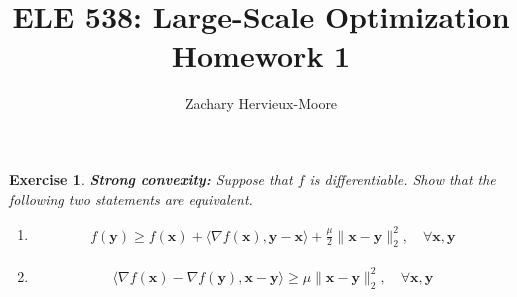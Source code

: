 \documentclass[12pt]{article}
\title{ELE 538: Large-Scale Optimization \\ Homework 1}
\author{Zachary Hervieux-Moore}
\date{\displaydate{date}}
\theoremstyle{colon}
\newtheorem{exercise}{Exercise}
\begin{document}
\maketitle

\clearpage

\begin{exercise}
  \textbf{Strong convexity:} Suppose that $f$ is differentiable. Show that the following two statements are equivalent.

  \begin{enumerate}[label=\roman*)]
    \item
      \begin{gather*}
        f(\bm{y}) \geq f(\bm{x}) + \langle \nabla f(\bm{x}), \bm{y} - \bm{x} \rangle + \frac{\mu}{2} \lVert \bm{x} - \bm{y} \rVert_2^2, \quad \forall \bm{x}, \bm{y}
      \end{gather*}

    \item
      \begin{gather*}
        \langle \nabla f(\bm{x}) - \nabla f(\bm{y}), \bm{x} - \bm{y} \rangle \geq \mu \lVert \bm{x} - \bm{y} \rVert_2^2, \quad \forall \bm{x}, \bm{y}
      \end{gather*}
  \end{enumerate}
\end{exercise}
\end{document}
